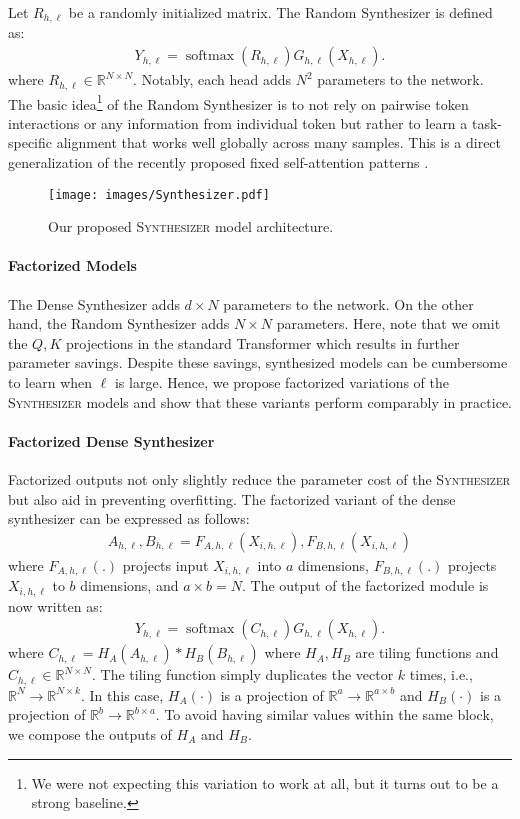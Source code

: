 \documentclass{article}
\DeclareMathOperator{\softmax}{softmax}
\begin{document}
Let $R_{h,\ell}$ be a randomly initialized matrix. The Random Synthesizer is defined as:
\begin{align}
Y_{h,\ell} = \softmax(R_{h,\ell})G_{h,\ell}(X_{h,\ell}).    
\end{align}
where $R_{h,\ell} \in \mathbb{R}^{N \times N}$. Notably, each head adds $N^2$ parameters to the network. The basic idea\footnote{We were not expecting this variation to work at all, but it turns out to be a strong baseline.} of the Random Synthesizer is to not rely on pairwise token interactions or any information from individual token but rather to learn a task-specific alignment that works well globally across many samples. This is a direct generalization of the recently proposed fixed self-attention patterns \cite{raganato2020fixed}.

\begin{figure*}[t]
\centering
     \texttt{[image: images/Synthesizer.pdf]}
    \label{fig:architecture}
    \caption{Our proposed \textsc{Synthesizer} model architecture.}
\end{figure*}
\paragraph{Factorized Models} 
The Dense Synthesizer adds $d \times N$ parameters to the network. On the other hand, the Random Synthesizer adds $N \times N$ parameters. Here, note that we omit the $Q,K$ projections in the standard Transformer which results in further parameter savings. Despite these savings, synthesized models can be cumbersome to learn when $\ell$ is large. Hence, we propose factorized variations of the \textsc{Synthesizer} models and show that these variants perform comparably in practice.
\paragraph{Factorized Dense Synthesizer}
Factorized outputs not only slightly reduce the parameter cost of the \textsc{Synthesizer} but also aid in preventing overfitting. The factorized variant of the dense synthesizer can be expressed as follows:
\begin{align}
A_{h,\ell}, B_{h,\ell} = F_{A,h,\ell}(X_{i,h,\ell}), F_{B,h,\ell}(X_{i,h,\ell})    
\end{align}
where $F_{A,h,\ell}(.)$ projects input $X_{i,h,\ell}$ into $a$ dimensions, $F_{B,h,\ell}(.)$ projects $X_{i,h,\ell}$ to $b$ dimensions, and $a \times b=N$. The output of the factorized module is now written as:
\begin{align}
Y_{h,\ell} = \softmax(C_{h,\ell})G_{h,\ell}(X_{h,\ell}).    
\end{align}
where $C_{h,\ell}=H_{A}(A_{h,\ell})* H_B(B_{h,\ell})$ where $H_A, H_B$ are tiling functions and $C_{h,\ell} \in \mathbb{R}^{N \times N}$. The tiling function simply duplicates the vector $k$ times, i.e., $\mathbb{R}^{N} \rightarrow \mathbb{R}^{N \times k}$. In this case, $H_A(\cdot)$ is a projection of $\mathbb{R}^{a} \rightarrow \mathbb{R}^{a \times b}$ and $H_B(\cdot)$ is a projection of $\mathbb{R}^{b} \rightarrow \mathbb{R}^{b \times a}$. To avoid having similar values within the same block, we compose the outputs of $H_{A}$ and $H_{B}$.
\end{document}
